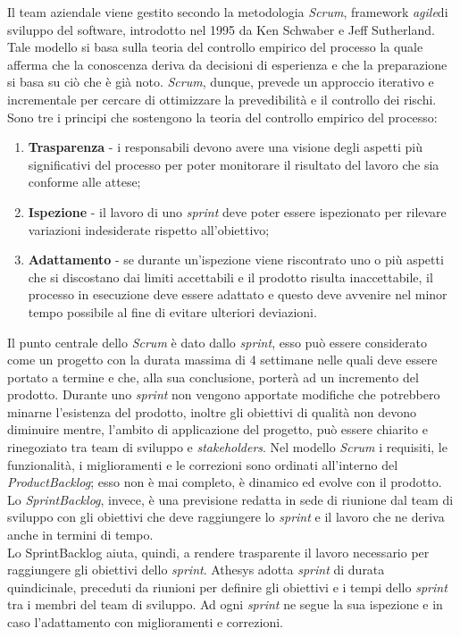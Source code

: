 Il team aziendale viene gestito secondo la metodologia \emph{\gls{Scrum}}\glsfirstoccur, framework \emph{\gls{agile}}\glsfirstoccur di sviluppo del software, introdotto nel 1995 da Ken Schwaber e Jeff Sutherland. Tale modello si basa sulla teoria del controllo empirico del processo la quale afferma che la conoscenza deriva da decisioni di esperienza e che la preparazione si basa su ciò che è già noto. \textit{Scrum}, dunque, prevede un approccio iterativo e incrementale per cercare di ottimizzare la prevedibilità e il controllo dei rischi. Sono tre i principi che sostengono la teoria del controllo empirico del processo:
\begin{enumerate}
	\item \textbf{Trasparenza} - i responsabili devono avere una visione degli aspetti più significativi del processo per poter monitorare il risultato del lavoro che sia conforme alle attese;
	\item \textbf{Ispezione} - il lavoro di uno \textit{sprint} deve poter essere ispezionato per rilevare variazioni indesiderate rispetto all'obiettivo;
	\item \textbf{Adattamento} - se durante un'ispezione viene riscontrato uno o più aspetti che si discostano dai limiti accettabili e il prodotto risulta inaccettabile, il processo in esecuzione deve essere adattato e questo deve avvenire nel minor tempo possibile al fine di evitare ulteriori deviazioni.
\end{enumerate}
Il punto centrale dello \textit{Scrum} è dato dallo \textit{sprint}, esso può essere considerato come un progetto con la durata massima di 4 settimane nelle quali deve essere portato a termine e che, alla sua conclusione, porterà ad un incremento del prodotto. Durante uno \textit{sprint} non vengono apportate modifiche che potrebbero minarne l'esistenza del prodotto, inoltre gli obiettivi di qualità non devono diminuire mentre, l'ambito di applicazione del progetto, può essere chiarito e rinegoziato tra team di sviluppo e \textit{stakeholders}. Nel modello \textit{Scrum} i requisiti, le funzionalità, i miglioramenti e le correzioni sono ordinati all'interno del \emph{\gls{ProductBacklog}}\glsfirstoccur; esso non è mai completo, è dinamico ed evolve con il prodotto.\\
Lo \emph{\gls{SprintBacklog}}\glsfirstoccur, invece, è una previsione redatta in sede di riunione dal team di sviluppo con gli obiettivi che deve raggiungere lo \textit{sprint} e il lavoro che ne deriva anche in termini di tempo.\\
Lo \gls{SprintBacklog} aiuta, quindi, a rendere trasparente il lavoro necessario per raggiungere gli obiettivi dello \textit{sprint}.
Athesys adotta \textit{sprint} di durata quindicinale, preceduti da riunioni per definire gli obiettivi e i tempi dello \textit{sprint} tra i membri del team di sviluppo. Ad ogni \textit{sprint} ne segue la sua ispezione e in caso l'adattamento con miglioramenti e correzioni.

